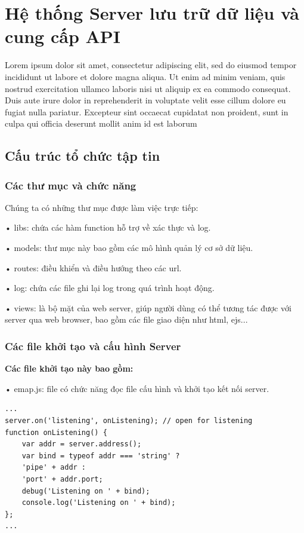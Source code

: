 \section{Hệ thống Server lưu trữ dữ liệu và cung cấp API}
Lorem ipsum dolor sit amet, consectetur adipiscing elit, sed do eiusmod tempor incididunt ut labore et dolore magna aliqua. Ut enim ad minim veniam, quis nostrud exercitation ullamco laboris nisi ut aliquip ex ea commodo consequat. Duis aute irure dolor in reprehenderit in voluptate velit esse cillum dolore eu fugiat nulla pariatur. Excepteur sint occaecat cupidatat non proident, sunt in culpa qui officia deserunt mollit anim id est laborum
\subsection{Cấu trúc tổ chức tập tin}
\subsubsection*{Các thư mục và chức năng}
Chúng ta có những thư mục được làm việc trực tiếp:

• libs: chứa các hàm function hỗ trợ về xác thực và log.

• models: thư mục này bao gồm các mô hình quản lý cơ sở dữ liệu.

• routes: điều khiển và điều hướng theo các url.

• log: chứa các file ghi lại log trong quá trình hoạt động.

• views: là bộ mặt của web server, giúp người dùng có thể tương tác được với server qua web browser, bao gồm các file giao diện như html, ejs...   


\subsubsection*{Các file khởi tạo và cấu hình Server}

\textbf{Các file khởi tạo này bao gồm:}

• emap.js: file có chức năng đọc file cấu hình và khởi tạo kết nối server.
\begin{lstlisting}[caption=emap.js]
...
server.on('listening', onListening); // open for listening
function onListening() {
	var addr = server.address();
	var bind = typeof addr === 'string' ?
	'pipe' + addr :
	'port' + addr.port;
	debug('Listening on ' + bind);
	console.log('Listening on ' + bind);
};
...
\end{lstlisting}

